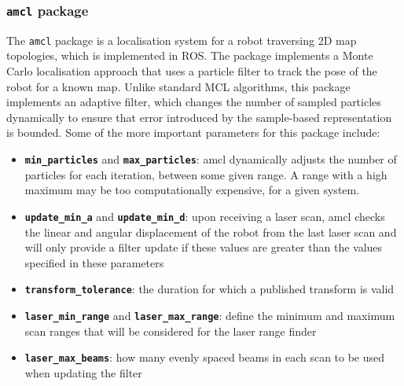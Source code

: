 \documentclass[a4paper]{article}
\begin{document}
\subsubsection{\texttt{amcl} package}
The \texttt{amcl} package is a localisation system for a robot traversing 2D map topologies, which is implemented in ROS. The package implements a Monte Carlo localisation approach that uses a particle filter to track the pose of the robot for a known map. Unlike standard MCL algorithms, this package implements an adaptive filter, which changes the number of sampled particles dynamically to ensure that error introduced by the sample-based representation is bounded. Some of the more important parameters for this package include:
\begin{itemize}
\item \textbf{\texttt{min\_particles}} and \textbf{\texttt{max\_particles}}: amcl dynamically adjusts the number of particles for each iteration, between some given range. A range with a high maximum may be too computationally expensive, for a given system.
\item \textbf{\texttt{update\_min\_a}} and \textbf{\texttt{update\_min\_d}}: upon receiving a laser scan, amcl checks the linear and angular displacement of the robot from the last laser scan and will only provide a filter update if these values are greater than the values specified in these parameters 
\item \textbf{\texttt{transform\_tolerance}}: the duration for which a published transform is valid
\item \textbf{\texttt{laser\_min\_range}} and \textbf{\texttt{laser\_max\_range}}: define the minimum and maximum scan ranges that will be considered for the laser range finder 
\item \textbf{\texttt{laser\_max\_beams}}: how many evenly spaced beams in each scan to be used when updating the filter
\end{itemize}
\end{document}
